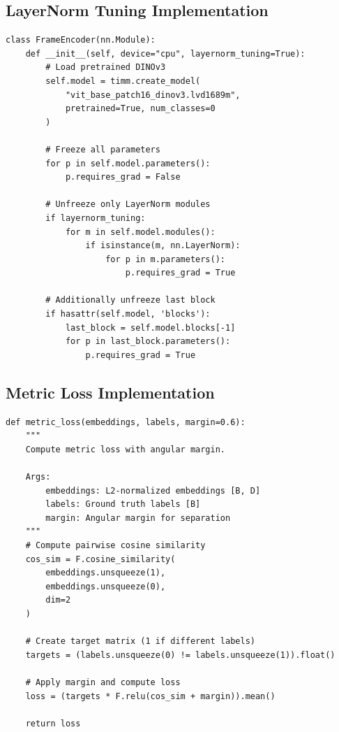 \documentclass[11pt,a4paper]{article}
\begin{document}
\subsection{LayerNorm Tuning Implementation}

\begin{lstlisting}[caption=LayerNorm-Specific Fine-tuning]
class FrameEncoder(nn.Module):
    def __init__(self, device="cpu", layernorm_tuning=True):
        # Load pretrained DINOv3
        self.model = timm.create_model(
            "vit_base_patch16_dinov3.lvd1689m",
            pretrained=True, num_classes=0
        )
        
        # Freeze all parameters
        for p in self.model.parameters():
            p.requires_grad = False
        
        # Unfreeze only LayerNorm modules
        if layernorm_tuning:
            for m in self.model.modules():
                if isinstance(m, nn.LayerNorm):
                    for p in m.parameters():
                        p.requires_grad = True
        
        # Additionally unfreeze last block
        if hasattr(self.model, 'blocks'):
            last_block = self.model.blocks[-1]
            for p in last_block.parameters():
                p.requires_grad = True
\end{lstlisting}

\subsection{Metric Loss Implementation}

\begin{lstlisting}[caption=Angular Margin Metric Loss]
def metric_loss(embeddings, labels, margin=0.6):
    """
    Compute metric loss with angular margin.
    
    Args:
        embeddings: L2-normalized embeddings [B, D]
        labels: Ground truth labels [B]
        margin: Angular margin for separation
    """
    # Compute pairwise cosine similarity
    cos_sim = F.cosine_similarity(
        embeddings.unsqueeze(1),
        embeddings.unsqueeze(0),
        dim=2
    )
    
    # Create target matrix (1 if different labels)
    targets = (labels.unsqueeze(0) != labels.unsqueeze(1)).float()
    
    # Apply margin and compute loss
    loss = (targets * F.relu(cos_sim + margin)).mean()
    
    return loss
\end{lstlisting}
\end{document}
